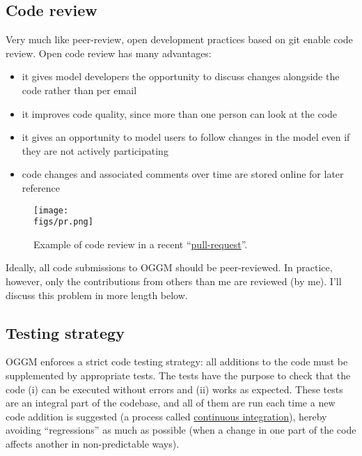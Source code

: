 \subsection{Code review}

Very much like peer-review, open development practices based on git enable code review. Open code review has many
advantages:
\begin{itemize}[nosep]
\item {} 
it gives model developers the opportunity to discuss changes alongside the code rather than per email

\item {} 
it improves code quality, since more than one person can look at the code

\item {} 
it gives an opportunity to model users to follow changes in the model even if they are not actively participating

\item {} 
code changes and associated comments over time are stored online for later reference

\end{itemize}


\begin{figure}[h]
\centering
\texttt{[image: \\figs/pr.png]}
\caption{Example of code review in a recent “\href{https://github.com/OGGM/oggm/pull/1142}{pull-request}”.}
\end{figure}

Ideally, all code submissions to OGGM should be peer-reviewed. In practice, however, only the contributions from others
than me are reviewed (by me). I’ll discuss this problem in more length below.


\subsection{Testing strategy}

OGGM enforces a strict code testing strategy: all additions to the code must be supplemented by appropriate tests. The
tests have the purpose to check that the code (i) can be executed without errors and (ii) works as expected. These tests
are an integral part of the codebase, and all of them are run each time a new code addition is suggested (a process
called \href{https://en.wikipedia.org/wiki/Continuous\_integration\#Run\_tests\_in\_CI}{continuous integration}), hereby
avoiding “regressions” as much as possible (when a change in one part of the code affects another in non-predictable
ways).

